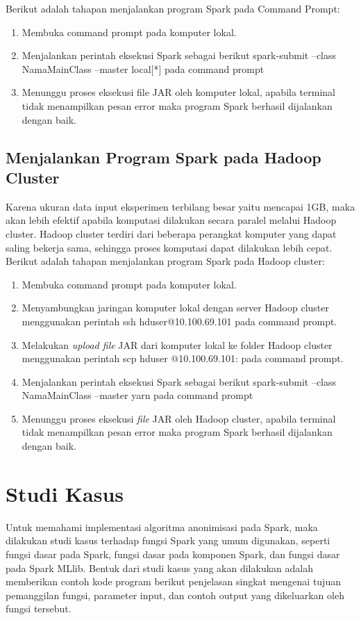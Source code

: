 \noindent Berikut adalah tahapan menjalankan program Spark pada Command Prompt:
\begin{enumerate}
\item Membuka command prompt pada komputer lokal.
\item Menjalankan perintah eksekusi Spark sebagai berikut \textsf{spark-submit --class NamaMainClass --master local[*] } pada command prompt
\item Menunggu proses eksekusi file JAR oleh komputer lokal, apabila terminal tidak menampilkan pesan error maka program Spark berhasil dijalankan dengan baik.
\end{enumerate}

\subsection{Menjalankan Program Spark pada Hadoop Cluster}
Karena ukuran data input eksperimen terbilang besar yaitu mencapai 1GB, maka akan lebih efektif apabila komputasi dilakukan secara paralel melalui Hadoop cluster. Hadoop cluster terdiri dari beberapa perangkat komputer yang dapat saling bekerja sama, sehingga proses komputasi dapat dilakukan lebih cepat.\\

\noindent Berikut adalah tahapan menjalankan program Spark pada Hadoop cluster:
\begin{enumerate}
\item Membuka command prompt pada komputer lokal.
\item Menyambungkan jaringan komputer lokal dengan server Hadoop cluster menggunakan perintah \textsf{ssh hduser@10.100.69.101} pada command prompt.
\item Melakukan \textit{upload file} JAR dari komputer lokal ke folder Hadoop cluster menggunakan perintah \textsf{scp  hduser
$@$10.100.69.101:} pada command prompt.
\item Menjalankan perintah eksekusi Spark sebagai berikut \textsf{spark-submit --class NamaMainClass --master yarn } pada command prompt
\item Menunggu proses eksekusi \textit{file} JAR oleh Hadoop cluster, apabila terminal tidak menampilkan pesan error maka program Spark berhasil dijalankan dengan baik.
\end{enumerate}

\newpage
\section{Studi Kasus}
Untuk memahami implementasi algoritma anonimisasi pada Spark, maka dilakukan studi kasus terhadap fungsi Spark yang umum digunakan, seperti fungsi dasar pada Spark, fungsi dasar pada komponen Spark, dan fungsi dasar pada Spark MLlib. Bentuk dari studi kasus yang akan dilakukan adalah memberikan contoh kode program berikut penjelasan singkat mengenai tujuan pemanggilan fungsi, parameter input, dan contoh output yang dikeluarkan oleh fungsi tersebut.

